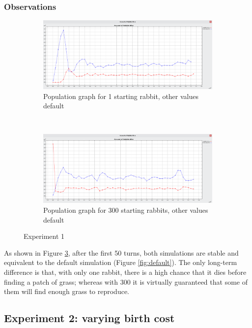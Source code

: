 \documentclass[11pt]{article}
\begin{document}
\subsubsection{Observations}

\begin{figure}[h]
    \centering
    \begin{subfigure}{\textwidth}
        \includegraphics[width = \textwidth]{1-rabbit-default}
        \caption{Population graph for 1 starting rabbit, other values default}
        \label{fig:1-rabbit}
    \end{subfigure}
    ~
    \begin{subfigure}{\textwidth}
        \includegraphics[width = \textwidth]{300-rabbits-default}
        \caption{Population graph for 300 starting rabbits, other values default}
        \label{fig:300-rabbits}
    \end{subfigure}
    \caption{Experiment 1}\label{fig:exp-1}
\end{figure}

As shown in Figure \ref{fig:exp-1}, after the first 50 turns, both simulations are stable and equivalent to the default simulation (Figure \ref{fig:default}). The only long-term difference is that, with only one rabbit, there is a high chance that it dies before finding a patch of grass; whereas with 300 it is virtually guaranteed that some of them will find enough grass to reproduce.


\subsection{Experiment 2: varying birth cost}
\end{document}
